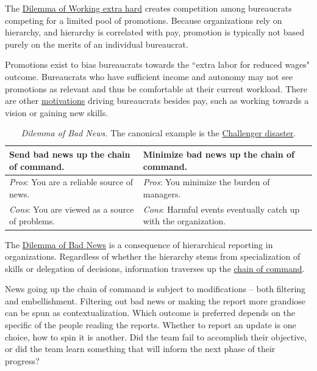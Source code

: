 The \href{table:work-extra-or-work-as-expected}{Dilemma of Working extra hard} creates competition among bureaucrats competing for a limited pool of promotions. Because organizations rely on hierarchy, and hierarchy is correlated with pay, promotion is typically not based purely on the merits of an individual bureaucrat. 

Promotions exist to bias bureaucrats towards the ``extra labor for reduced wages" outcome. Bureaucrats who have sufficient income and autonomy may not see promotions as relevant and thus be comfortable at their current workload. There are other \hyperref[sec:motivations]{motivations} driving bureaucrats besides pay, such as working towards a vision or gaining new skills. 

\begin{center}
\begin{table}[H] %
\begin{tabular}{ | m{\dilemmatablewidth}| m{\dilemmatablewidth} | } 
  \hline
  \textbf{Send bad news up the chain of command.} &
  \textbf{Minimize bad news up the chain of command.} \\
  \hline
  \textit{Pros}: You are a reliable source of news. &
  \textit{Pros}: You minimize the burden of managers. \\
  \hline
  \textit{Cons}: You are viewed as a source of problems. & 
  \textit{Cons}: Harmful events eventually catch up with the organization.  \\
  \hline
\end{tabular}
\caption{\textit{Dilemma of Bad News.}
The canonical example is the \href{https://en.wikipedia.org/wiki/Space_Shuttle_Challenger_disaster}{Challenger disaster}.}
\label{table:bad-news-up-the-chain}
\end{table}
\end{center}

The \href{table:bad-news-up-the-chain}{Dilemma of Bad News} is a consequence of hierarchical reporting in organizations. Regardless of whether the hierarchy stems from specialization of skills or delegation of decisions, information traverses up the \href{https://en.wikipedia.org/wiki/Command_hierarchy}{chain of command}. 

News going up the chain of command is subject to modifications -- both filtering and embellishment. Filtering out bad news or making the report more grandiose can be spun as contextualization. Which outcome is preferred depends on the specific of the people reading the reports. Whether to report an update is one choice, how to spin it is another. Did the team fail to accomplish their objective, or did the team learn something that will inform the next phase of their progress?


